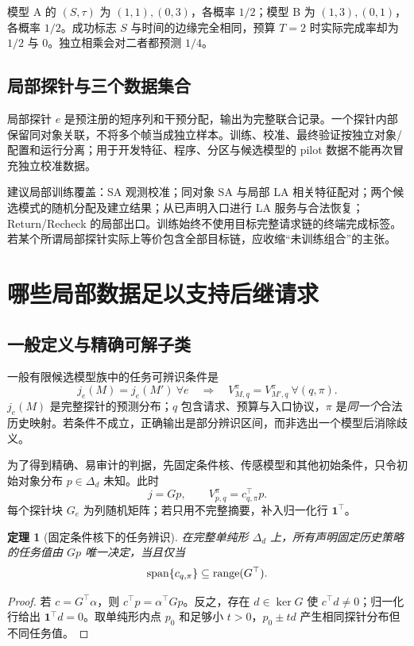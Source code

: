 \documentclass[11pt,a4paper,fontset=fandol]{ctexart}
\newtheorem{theorem}{定理}[section]
\theoremstyle{definition}\newtheorem{definition}[theorem]{定义}
\theoremstyle{remark}\newtheorem{remark}[theorem]{说明}
\numberwithin{equation}{section}
\begin{document}
\begin{example}[正确边缘仍会给出错误期限预测]
模型 A 的 $(S,\tau)$ 为 $(1,1),(0,3)$，各概率 $1/2$；模型 B 为 $(1,3),(0,1)$，各概率 $1/2$。成功标志 $S$ 与时间的边缘完全相同，预算 $T=2$ 时实际完成率却为 $1/2$ 与 $0$。独立相乘会对二者都预测 $1/4$。
\end{example}

\subsection{局部探针与三个数据集合}
局部探针 $e$ 是预注册的短序列和干预分配，输出为完整联合记录。一个探针内部保留同对象关联，不将多个帧当成独立样本。训练、校准、最终验证按独立对象/配置和运行分离；用于开发特征、程序、分区与候选模型的 pilot 数据不能再次冒充独立校准数据。

建议局部训练覆盖：SA 观测校准；同对象 SA 与局部 LA 相关特征配对；两个候选模式的随机分配及建立结果；从已声明入口进行 LA 服务与合法恢复；Return/Recheck 的局部出口。训练始终不使用目标完整请求链的终端完成标签。若某个所谓局部探针实际上等价包含全部目标链，应收缩“未训练组合”的主张。

\section{哪些局部数据足以支持后继请求}
\label{sec:ident}
\subsection{一般定义与精确可解子类}
一般有限候选模型族中的任务可辨识条件是
\begin{equation}
 j_e(M)=j_e(M')\ \forall e
 \quad\Longrightarrow\quad
 V_{M,q}^{\pi}=V_{M',q}^{\pi}\ \forall(q,\pi).
 \label{eq:general-ident}
\end{equation}
$j_e(M)$ 是完整探针的预测分布；$q$ 包含请求、预算与入口协议，$\pi$ 是\emph{同一个}合法历史映射。若条件不成立，正确输出是部分辨识区间，而非选出一个模型后消除歧义。

为了得到精确、易审计的判据，先固定条件核、传感模型和其他初始条件，只令初始对象分布 $p\in\Delta_d$ 未知。此时
\begin{equation}
 j=Gp,\qquad V_{p,q}^{\pi}=c_{q,\pi}^{\top}p.
 \label{eq:linear}
\end{equation}
每个探针块 $G_e$ 为列随机矩阵；若只用不完整摘要，补入归一化行 $\mathbf1^\top$。

\begin{theorem}[固定条件核下的任务辨识]
\label{thm:ident}
在完整单纯形 $\Delta_d$ 上，所有声明固定历史策略的任务值由 $Gp$ 唯一决定，当且仅当
\begin{equation}
 \operatorname{span}\{c_{q,\pi}\}\subseteq\operatorname{range}(G^\top).
 \label{eq:rowspace}
\end{equation}
\end{theorem}
\begin{proof}
若 $c=G^\top\alpha$，则 $c^\top p=\alpha^\top Gp$。反之，存在 $d\in\ker G$ 使 $c^\top d\ne0$；归一化行给出 $\mathbf1^\top d=0$。取单纯形内点 $p_0$ 和足够小 $t>0$，$p_0\pm td$ 产生相同探针分布但不同任务值。
\end{proof}
\end{document}
